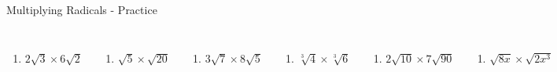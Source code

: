 \documentclass[aspectratio=169]{beamer}
\begin{document}
\begin{frame}{Multiplying Radicals - Practice}
\begin{tcolorbox}[colback=lightgray,colframe=accent,title=Practice Problems]
\footnotesize
\begin{columns}[T]
\begin{enumerate}[label=1\textbf{a})]
  \item $2\sqrt{3} \times 6\sqrt{2}$
\end{enumerate}
\begin{enumerate}[label=1\textbf{b})]
  \item $\sqrt{5} \times \sqrt{20}$
\end{enumerate}
\begin{enumerate}[label=1\textbf{c})]
  \item $3\sqrt{7} \times 8\sqrt{5}$
\end{enumerate}
\begin{enumerate}[label=1\textbf{d})]
  \item $\sqrt[3]{4} \times \sqrt[3]{6}$
\end{enumerate}
\begin{enumerate}[label=1\textbf{e})]
  \item $2\sqrt{10} \times 7\sqrt{90}$
\end{enumerate}
\begin{enumerate}[label=1\textbf{f})]
  \item $\sqrt{8x} \times \sqrt{2x^3}$
\end{enumerate}
\end{columns}
\end{tcolorbox}
\end{frame}
\end{document}

